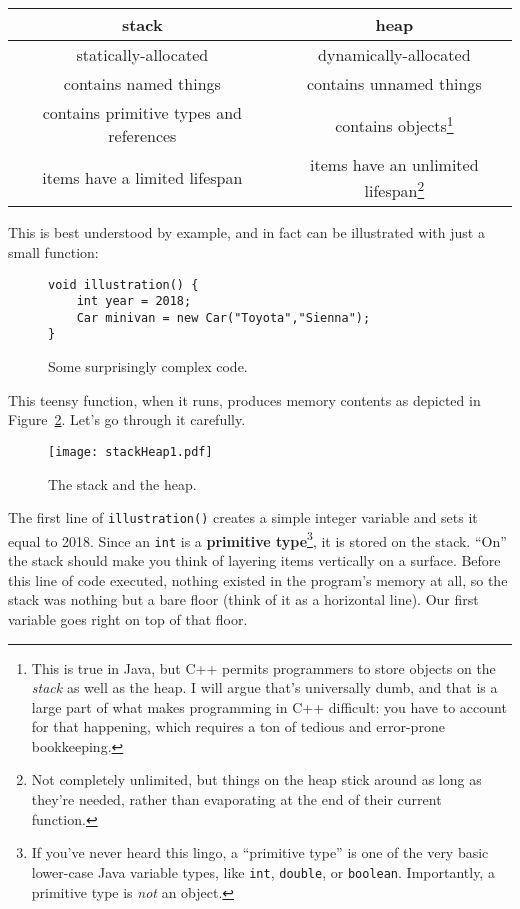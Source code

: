 \vspace{.2in}
\begin{tabular}{c|c}
\textbf{stack} & \textbf{heap} \\
\hline
statically-allocated & dynamically-allocated \\
\index{names}
contains named things & contains unnamed things \\
contains primitive types and references & contains objects\footnote{This is
true in Java, but C++ permits programmers to store objects on the
\textit{stack} as well as the heap. I will argue that's universally dumb, and
that is a large part of what makes programming in C++ difficult: you have to
account for that happening, which requires a ton of tedious and error-prone
bookkeeping.} \\
\index{lifespan}
items have a limited lifespan & items have an unlimited lifespan\footnote{Not
completely unlimited, but things on the heap stick around as long as they're
needed, rather than evaporating at the end of their current function.} \\
\end{tabular}
\vspace{.2in}

This is best understood by example, and in fact can be illustrated with just a
small function:

\begin{figure}
\begin{Verbatim}[fontsize=\small,samepage=true,frame=single]
void illustration() {
    int year = 2018;
    Car minivan = new Car("Toyota","Sienna");
}
\end{Verbatim}
\caption{Some surprisingly complex code.}
\label{fig:firstCode}
\end{figure}

This teensy function, when it runs, produces memory contents as depicted in
Figure~\ref{fig:stackHeap1}. Let's go through it carefully.

\begin{figure}   %
\centering
\texttt{[image: stackHeap1.pdf]}
\caption{The stack and the heap.}
\label{fig:stackHeap1}
\end{figure}

The first line of \texttt{illustration()} creates a simple integer variable
and sets it equal to 2018. Since an \texttt{int} is a \textbf{primitive
type}\footnote{If you've never heard this lingo, a ``primitive type'' is one of
the very basic lower-case Java variable types, like \texttt{int},
\texttt{double}, or \texttt{boolean}. Importantly, a primitive type is
\textit{not} an object.}, it is stored on the stack. ``On'' the stack should
make you think of layering items vertically on a surface. Before this line of
code executed, nothing existed in the program's memory at all, so the stack
was nothing but a bare floor (think of it as a horizontal line). Our first
variable goes right on top of that floor.

